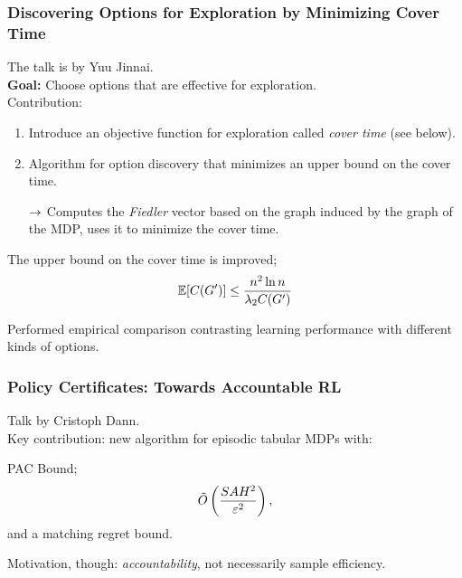 \spacerule

\subsubsection{Discovering Options for Exploration by Minimizing Cover Time}

 The talk is by Yuu Jinnai. \\

{\bf Goal:} Choose options that are effective for exploration. \\

Contribution:
\begin{enumerate}
    \item Introduce an objective function for exploration called {\it cover time} (see below).
    \item Algorithm for option discovery that minimizes an upper bound on the cover time.
    
    $\rightarrow$ Computes the {\it Fiedler} vector based on the graph induced by the graph of the MDP, uses it to minimize the cover time.
\end{enumerate}


\begin{theorem}
The upper bound on the cover time is improved;
\[
\mathbb{E}[C(G')] \leq \frac{n^2 \ln n}{\lambda_2 C(G')}
\]
\end{theorem}

Performed empirical comparison contrasting learning performance with different kinds of options. \\

\spacerule

\subsubsection{Policy Certificates: Towards Accountable RL}
Talk by Cristoph Dann. \\

Key contribution: new algorithm for episodic tabular MDPs with:
\begin{theorem}
PAC Bound;
\[
\tilde{O}\left(\frac{SAH^2}{\varepsilon^2}\right),
\]
and a matching regret bound.
\end{theorem}

Motivation, though: {\it accountability}, not necessarily sample efficiency. \\

